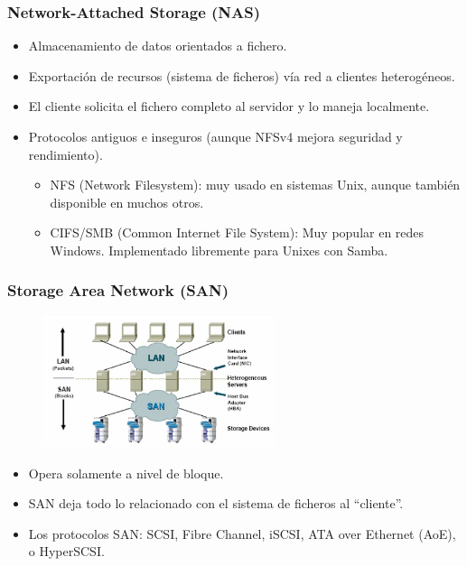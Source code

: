 \documentclass{beamer}
\begin{document}
\begin{frame}
  \frametitle{Network-Attached Storage (NAS)}
  \begin{itemize}
    \item Almacenamiento de datos \alert{orientados a fichero}.
    \item Exportación de recursos (sistema de ficheros) vía red a clientes heterogéneos.
    \item El cliente solicita el fichero completo al servidor y lo maneja localmente.
    \item Protocolos antiguos e inseguros (aunque NFSv4 mejora seguridad y rendimiento). 
	  \begin{itemize}
	    \item \alert{NFS} (Network Filesystem): muy usado en sistemas Unix, aunque también disponible en muchos otros. 
	    \item \alert{CIFS/SMB} (Common Internet File System): Muy popular en redes Windows. Implementado libremente para Unixes con \alert{Samba}.
	  \end{itemize}

  \end{itemize}
\end{frame}

\begin{frame}
  \frametitle{Storage Area Network (SAN)}

\begin{figure}[h]
\begin{center}
  \includegraphics[width=6.75cm]{figs/SAN.png}
\end{center}
\end{figure}

  \begin{itemize}
    \item Opera solamente a \alert{nivel de bloque}. 
     \item SAN deja todo lo relacionado con el sistema de ficheros al ``cliente''.
    \item Los protocolos SAN: SCSI, Fibre Channel, iSCSI, ATA over Ethernet (AoE), o HyperSCSI.
  \end{itemize}


\end{frame}
\end{document}
